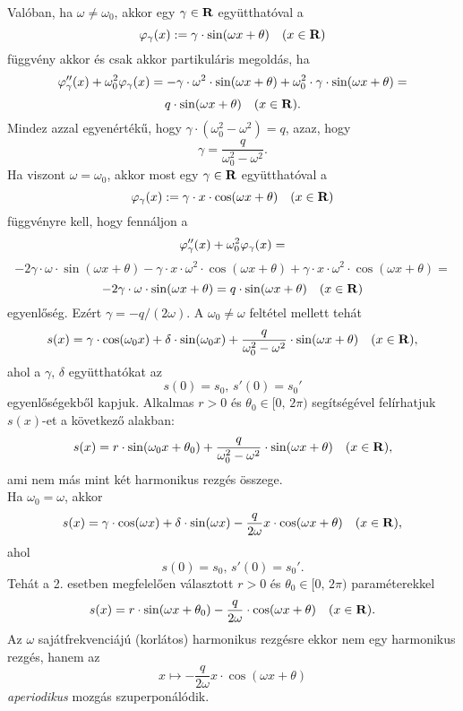 Valóban, ha $\omega \neq \omega_0$, akkor egy $\gamma \in \mathbf{R}$ együtthatóval a
\[
	\varphi_\gamma(x) := \gamma \cdot \sin(\omega x + \theta) \quad (x \in \mathbf{R})
\]
függvény akkor és csak akkor partikuláris megoldás, ha
\[
	\varphi_\gamma''(x) + \omega_0^2 \varphi_\gamma(x) = - \gamma \cdot \omega^2 \cdot \sin(\omega x + \theta) + \omega_0^2 \cdot \gamma \cdot \sin(\omega x + \theta) =
\]
\[
	q \cdot \sin(\omega x + \theta) \quad (x \in \mathbf{R}).
\]
Mindez azzal egyenértékű, hogy $\gamma \cdot (\omega_0^2 - \omega^2) = q$, azaz, hogy
\[
	\gamma = \frac{q}{\omega_0^2 - \omega^2}.
\]
Ha viszont $\omega = \omega_0$, akkor most egy $\gamma \in \mathbf{R}$ együtthatóval a
\[
	\varphi_\gamma(x) := \gamma \cdot x \cdot \cos(\omega x + \theta) \quad (x \in \mathbf{R})
\]
függvényre kell, hogy fennáljon a
\[
	\varphi_\gamma''(x) + \omega_0^2 \varphi_\gamma(x) =
\]
\[
	-2 \gamma \cdot \omega \cdot \sin(\omega x + \theta) - \gamma \cdot x \cdot \omega^2 \cdot \cos(\omega x + \theta) + \gamma \cdot x \cdot \omega^2 \cdot \cos(\omega x + \theta) =
\]
\[
	- 2 \gamma \cdot \omega \cdot \sin(\omega x + \theta) = q \cdot \sin(\omega x + \theta) \quad (x \in \mathbf{R})
\]
egyenlőség. Ezért $\gamma = - q / (2\omega)$.
A $\omega_0 \neq \omega$ feltétel mellett tehát
\[
	s(x) = \gamma \cdot \cos(\omega_0 x) + \delta \cdot \sin(\omega_0 x) + \frac{q}{\omega_0^2 - \omega^2} \cdot \sin(\omega x + \theta) \quad (x \in \mathbf{R}),
\]
ahol a $\gamma, \, \delta$ együtthatókat az
\[
	s(0) = s_0, \, s'(0) = s_0'
\]
egyenlőségekből kapjuk. Alkalmas $r > 0$ és $\theta_0 \in [0, \, 2\pi)$ segítségével felírhatjuk $s(x)$-et a következő alakban:
\[
	s(x) = r \cdot \sin(\omega_0 x + \theta_0) + \frac{q}{\omega_0^2 - \omega^2} \cdot \sin(\omega x + \theta) \quad (x \in \mathbf{R}),
\]
ami nem más mint két harmonikus rezgés összege.\\

Ha $\omega_0 = \omega$, akkor
\[
	s(x) = \gamma \cdot \cos(\omega x) + \delta \cdot \sin(\omega x) - \frac{q}{2\omega} x \cdot \cos(\omega x + \theta) \quad (x \in \mathbf{R}),
\]
ahol
\[
	s(0) = s_0, \, s'(0) = s_0'.
\]
Tehát a 2. esetben megfelelően választott $r > 0$ és $\theta_0 \in [0, \, 2\pi)$ paraméterekkel 
\[
	s(x) = r \cdot \sin(\omega x + \theta_0) - \frac{q}{2\omega} \cdot \cos(\omega x + \theta) \quad (x \in \mathbf{R}).
\]
Az $\omega$ sajátfrekvenciájú (korlátos) harmonikus rezgésre ekkor nem egy harmonikus rezgés, hanem az
\[
	x \mapsto - \frac{q}{2 \omega} x \cdot \cos(\omega x + \theta)
\]
\textit{aperiodikus} mozgás szuperponálódik. 
